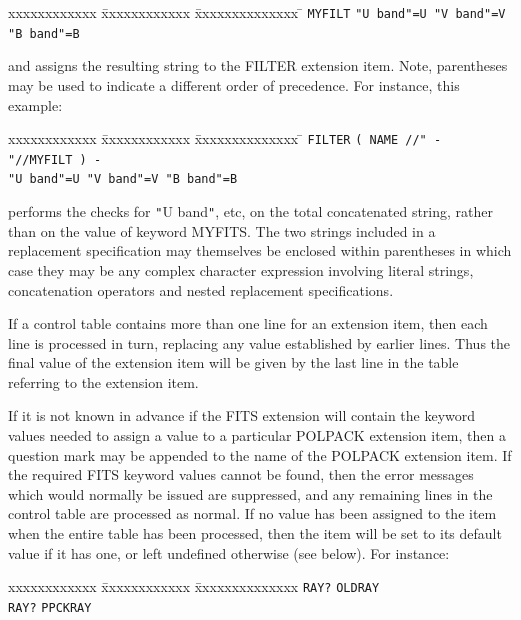 \documentclass[twoside,11pt]{article}
\renewcommand{\_}{\texttt{\symbol{95}}}
\begin{document}
{{\begin{tabbing}
 xxxxxxxxxxxx \= xxxxxxxxxxxx            \= xxxxxxxxxxxxxx \= \kill
              \>  \texttt{MYFILT}        \> \texttt{"U band"=U "V band"=V "B band"=B}
\end{tabbing}
 
      and assigns the resulting string to the FILTER extension item.
      Note, parentheses may be used to indicate a different order of
      precedence. For instance, this example:
 
\begin{tabbing}
 xxxxxxxxxxxx \= xxxxxxxxxxxx            \= xxxxxxxxxxxxxx \= \kill
              \>  \texttt{FILTER}        \> \texttt{( NAME //" - "//MYFILT ) -} \\
              \>                         \> \= \texttt{"U band"=U "V band"=V "B band"=B}
\end{tabbing}
 
      performs the checks for {\tt "}U band{\tt "}, etc, on the total 
      concatenated
      string, rather than on the value of keyword MYFITS. The two 
      strings included in a replacement specification may themselves be 
      enclosed within parentheses in which case they may be any complex
      character expression involving literal strings, concatenation
      operators and nested replacement specifications.

      If a control table contains more than one line for an extension
      item, then each line is processed in turn, replacing any value
      established by earlier lines. Thus the final value of the extension
      item will be given by the last line in the table referring to the
      extension item.

      If it is not known in advance if the FITS extension will contain the
      keyword values needed to assign a value to a particular POLPACK
      extension item, then a question mark may be appended to the name of
      the POLPACK extension item. If the required FITS keyword values
      cannot be found, then the error messages which would normally be
      issued are suppressed, and any remaining lines in the control table
      are processed as normal. If no value has been assigned to the item
      when the entire table has been processed, then the item will be set
      to its default value if it has one, or left undefined otherwise (see
      below). For instance:

\begin{tabbing}
 xxxxxxxxxxxx \= xxxxxxxxxxxx            \= xxxxxxxxxxxxxx \kill
              \>  \texttt{RAY?}          \> \texttt{OLDRAY} \\
              \>  \texttt{RAY?}          \> \texttt{PPCKRAY} 
\end{tabbing}

}}
\end{document}
